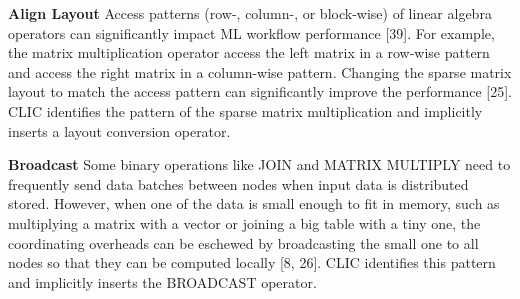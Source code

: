 \textbf{Align Layout}
Access patterns (row-, column-, or block-wise) of linear algebra operators can significantly impact ML workflow performance [39]. 
For example, the matrix multiplication operator access the left matrix in a row-wise pattern and access the right matrix in a column-wise pattern. 
Changing the sparse matrix layout to match the access pattern can significantly improve the performance [25]. 
CLIC identifies the pattern of the sparse matrix multiplication and implicitly inserts a layout conversion operator.

\textbf{Broadcast}
Some binary operations like JOIN and MATRIX MULTIPLY need to frequently send data batches between nodes when input data is distributed stored. 
However, when one of the data is small enough to fit in memory, such as multiplying a matrix with a vector or joining a big table with a tiny one, the coordinating overheads can be eschewed by broadcasting the small one to all nodes so that they can be computed locally [8, 26].
CLIC identifies this pattern and implicitly inserts the BROADCAST operator.

